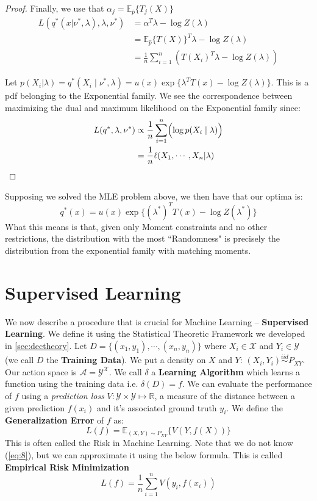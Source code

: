 \documentclass[]{article}
\theoremstyle{mattstyle}
\theoremstyle{definition}
\begin{document}
\begin{proof}
	Finally, we use that $\alpha_j = \mathbb{E}_{\hat{p}}\{T_j(X)\}$
	\begin{align*}
	L(q^*(x| \nu^*, \lambda),\lambda,\nu^*) &= \alpha^T\lambda -\log Z(\lambda)\\
	&= \mathbb{E}_{\hat{p}}\{T(X)\}^T\lambda - \log Z(\lambda)\\
	&= \frac{1}{n}\sum_{i=1}^n \left( T(X_i)^T\lambda - \log Z(\lambda) \right)
	\end{align*}
	
	Let  $p(X_i | \lambda) = q^*(X_i \mid \nu^*, \lambda) = u(x)\exp\{ \lambda^TT(x) - \log Z(\lambda)\}$. This is a pdf belonging to the Exponential family. We see the correspondence between maximizing the dual and maximum likelihood on the Exponential family since:
	\begin{align*}
	L(q^*,\lambda,\nu^*) &\propto \frac{1}{n}\sum_{i=1}^n \Bigl( \log p(X_i \mid \lambda) \Bigr) \\
	&=\frac{1}{n}\ell(X_1, \cdots, X_n | \lambda)
	\end{align*}
\end{proof}

Supposing we solved the MLE problem above, we then have that our optima is:
$$q^*(x)=u(x)\exp\{ (\lambda^*)^TT(x) - \log Z(\lambda^*)\}$$
What this means is that, given only Moment constraints and no other restrictions, the distribution with the most ``Randomness" is precisely the distribution from the exponential family with matching moments.

\newpage

\section{Supervised Learning}

We now describe a procedure that is crucial for Machine Learning -- \textbf{Supervised Learning}. We define it using the Statistical Theoretic Framework we developed in \ref{sec:dectheory}. Let $D=\{(x_1,y_1), \cdots, (x_n,y_n)\}$ where $X_i \in \mathcal{X}$ and $Y_i \in \mathcal{Y}$ (we call $D$ the \textbf{Training Data}). We put a density on $X$ and $Y$: $(X_i,Y_i) \overset{iid}{\sim} P_{XY}$. Our action space is $\mathcal{A} = \mathcal{Y}^\mathcal{X}$. We call \(\delta\) a \textbf{Learning Algorithm} which learns a function using the training data i.e. $\delta(D) = f$. We can evaluate the performance of $f$ using a \emph{prediction loss} $V: \mathcal{Y} \times \mathcal{Y} \mapsto \mathbb{R}$, a measure of the distance between a given prediction $f(x_i)$ and it’s associated ground truth $y_i$. We define the \textbf{Generalization Error} of $f$ as:
\begin{equation}\label{eq:8}
L(f) = \mathbb{E}_{(X,Y)\sim P_{XY}}\{V(Y,f(X)) \}
\end{equation}
This is often called the Risk in Machine Learning. Note that we do not know (\ref{eq:8}), but we can approximate it using the below formula. This is called \textbf{Empirical Risk Minimization}
\begin{equation}\label{eq:erm}
L(f) = \frac{1}{n}\sum_{i=1}^n V\left(y_i,f(x_i)\right)
\end{equation}
\end{document}
